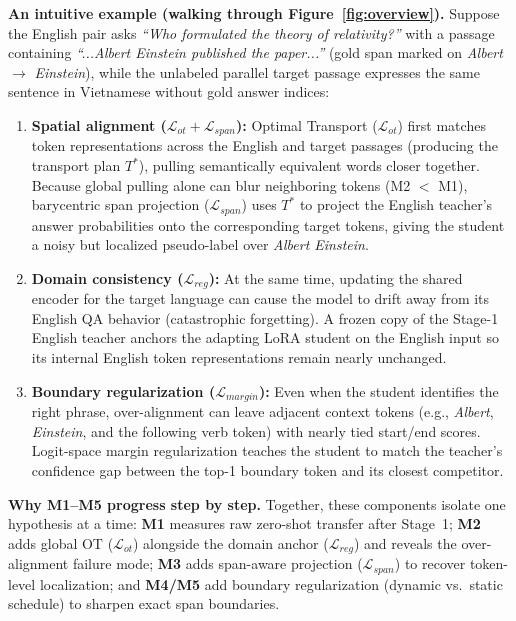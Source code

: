 \documentclass[11pt]{article}
\begin{document}
\textbf{An intuitive example (walking through Figure~\ref{fig:overview}).} Suppose the English pair asks \emph{``Who formulated the theory of relativity?''} with a passage containing \emph{``...Albert Einstein published the paper...''} (gold span marked on \emph{Albert} $\to$ \emph{Einstein}), while the unlabeled parallel target passage expresses the same sentence in Vietnamese without gold answer indices:
\begin{enumerate}
    \item \textbf{Spatial alignment ($\mathcal{L}_{ot} + \mathcal{L}_{span}$):} Optimal Transport ($\mathcal{L}_{ot}$) first matches token representations across the English and target passages (producing the transport plan $T^*$), pulling semantically equivalent words closer together. Because global pulling alone can blur neighboring tokens (M2 $<$ M1), barycentric span projection ($\mathcal{L}_{span}$) uses $T^*$ to project the English teacher's answer probabilities onto the corresponding target tokens, giving the student a noisy but localized pseudo-label over \emph{Albert Einstein}.
    \item \textbf{Domain consistency ($\mathcal{L}_{reg}$):} At the same time, updating the shared encoder for the target language can cause the model to drift away from its English QA behavior (catastrophic forgetting). A frozen copy of the Stage-1 English teacher anchors the adapting LoRA student on the English input so its internal English token representations remain nearly unchanged.
    \item \textbf{Boundary regularization ($\mathcal{L}_{margin}$):} Even when the student identifies the right phrase, over-alignment can leave adjacent context tokens (e.g., \emph{Albert}, \emph{Einstein}, and the following verb token) with nearly tied start/end scores. Logit-space margin regularization teaches the student to match the teacher's confidence gap between the top-1 boundary token and its closest competitor.
\end{enumerate}

\textbf{Why M1--M5 progress step by step.} Together, these components isolate one hypothesis at a time: \textbf{M1} measures raw zero-shot transfer after Stage~1; \textbf{M2} adds global OT ($\mathcal{L}_{ot}$) alongside the domain anchor ($\mathcal{L}_{reg}$) and reveals the over-alignment failure mode; \textbf{M3} adds span-aware projection ($\mathcal{L}_{span}$) to recover token-level localization; and \textbf{M4/M5} add boundary regularization (dynamic vs.\ static schedule) to sharpen exact span boundaries.
\end{document}
